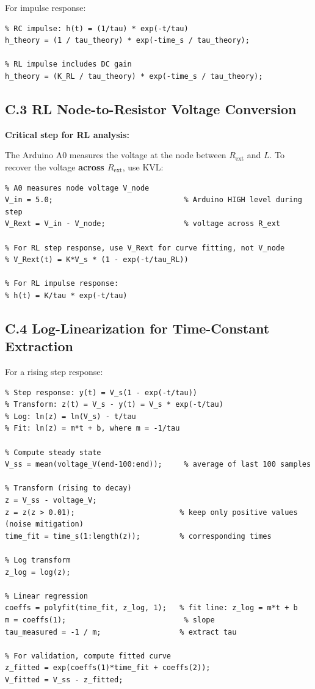 \documentclass[11pt,letterpaper]{article}
\begin{document}
\noindent
For impulse response:
\begin{verbatim}
% RC impulse: h(t) = (1/tau) * exp(-t/tau)
h_theory = (1 / tau_theory) * exp(-time_s / tau_theory);

% RL impulse includes DC gain
h_theory = (K_RL / tau_theory) * exp(-time_s / tau_theory);
\end{verbatim}

\subsection*{C.3 RL Node-to-Resistor Voltage Conversion}

\textbf{Critical step for RL analysis:}

The Arduino A0 measures the voltage at the node between $R_{\text{ext}}$ and $L$. To recover the voltage \textbf{across $R_{\text{ext}}$}, use KVL:

\begin{verbatim}
% A0 measures node voltage V_node
V_in = 5.0;                              % Arduino HIGH level during step
V_Rext = V_in - V_node;                  % voltage across R_ext

% For RL step response, use V_Rext for curve fitting, not V_node
% V_Rext(t) = K*V_s * (1 - exp(-t/tau_RL))

% For RL impulse response:
% h(t) = K/tau * exp(-t/tau)
\end{verbatim}

\subsection*{C.4 Log-Linearization for Time-Constant Extraction}

For a rising step response:

\begin{verbatim}
% Step response: y(t) = V_s(1 - exp(-t/tau))
% Transform: z(t) = V_s - y(t) = V_s * exp(-t/tau)
% Log: ln(z) = ln(V_s) - t/tau
% Fit: ln(z) = m*t + b, where m = -1/tau

% Compute steady state
V_ss = mean(voltage_V(end-100:end));     % average of last 100 samples

% Transform (rising to decay)
z = V_ss - voltage_V;
z = z(z > 0.01);                        % keep only positive values (noise mitigation)
time_fit = time_s(1:length(z));         % corresponding times

% Log transform
z_log = log(z);

% Linear regression
coeffs = polyfit(time_fit, z_log, 1);   % fit line: z_log = m*t + b
m = coeffs(1);                           % slope
tau_measured = -1 / m;                  % extract tau

% For validation, compute fitted curve
z_fitted = exp(coeffs(1)*time_fit + coeffs(2));
V_fitted = V_ss - z_fitted;
\end{verbatim}
\end{document}
